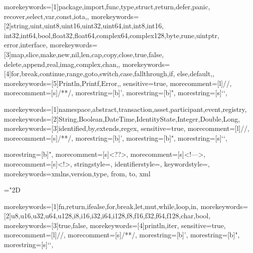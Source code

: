 %
  {morekeywords=[1]{package,import,func,type,struct,return,defer,panic,%
     recover,select,var,const,iota,},%
   morekeywords=[2]{string,uint,uint8,uint16,uint32,uint64,int,int8,int16,%
     int32,int64,bool,float32,float64,complex64,complex128,byte,rune,uintptr,%
     error,interface},%
   morekeywords=[3]{map,slice,make,new,nil,len,cap,copy,close,true,false,%
     delete,append,real,imag,complex,chan,},%
   morekeywords=[4]{for,break,continue,range,goto,switch,case,fallthrough,if,%
     else,default,},%
   morekeywords=[5]{Println,Printf,Error,},%
   sensitive=true,%
   morecomment=[l]{//},%
   morecomment=[s]{/*}{*/},%
   morestring=[b]',%
   morestring=[b]",%
   morestring=[s]{`}{`},%
   }

%
{morekeywords=[1]{namespace,abstract,transaction,asset,participant,event,registry},%
morekeywords=[2]{String,Boolean,DateTime,IdentityState,Integer,Double,Long},%
morekeywords=[3]{identified,by,extends,regex},%
sensitive=true,%
morecomment=[l]{//},%
morecomment=[s]{/*}{*/},%
morestring=[b]',%
morestring=[b]",%
morestring=[s]{`}{`},%
}

   
{
  morestring=[b]",
  morecomment=[s]{<?}{?>},
  morecomment=[s]{<!--}{-->},
  morecomment=[s]{<!}{>},
  stringstyle=\color{blue},
  identifierstyle=\color{brown},
  keywordstyle=\color{red},
  morekeywords={xmlns,version,type, from, to, xml} %
}


\mathchardef\mhyphen="2D

%
    {morekeywords=[1]{fn,return,ifealse,for,break,let,mut,while,loop,in},%
    morekeywords=[2]{u8,u16,u32,u64,u128,i8,i16,i32,i64,i128,f8,f16,f32,f64,f128,char,bool},%
    morekeywords=[3]{true,false},%
    morekeywords=[4]{println,iter},%
    sensitive=true,%
    morecomment=[l]{//},%
    morecomment=[s]{/*}{*/},%
    morestring=[b]',%
    morestring=[b]",%
    morestring=[s]{`}{`},%
}

  
